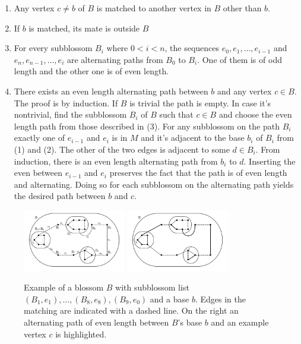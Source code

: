 \begin{enumerate}
    \item Any vertex $c \neq b$ of $B$ is matched to another vertex in $B$ other than $b$.
    \item If $b$ is matched, its mate is outside $B$
    \item For every subblossom $B_i$ where $0 < i < n$, the sequences $e_0, e_1, \dots, e_{i-1}$ and $e_n, e_{n-1}, \dots, e_i$ are alternating paths from $B_0$ to $B_i$. One of them is of odd length and the other one is of even length.
    \item There exists an even length alternating path between $b$ and any vertex $c \in B$. The proof is by induction. If $B$ is trivial the path is empty. In case it's nontrivial, find the subblossom $B_i$ of $B$ such that $c \in B$ and choose the even length path from those described in (3). For any subblossom on the path $B_i$ exactly one of $e_{i-1}$ and $e_{i}$ is in $M$ and it's adjacent to the base $b_i$ of $B_i$ from (1) and (2). The other of the two edges is adjacent to some $d \in B_i$. From induction, there is an even length alternating path from $b_i$ to $d$. Inserting the even between $e_{i-1}$ and $e_i$ preserves the fact that the path is of even length and alternating. Doing so for each subblossom on the alternating path yields the desired path between $b$ and $c$.
\end{enumerate}

\begin{figure}[b]
    \centering
    \includegraphics*[width=0.4\textwidth]{figures/Basic Blossom.png}
    \includegraphics*[width=0.4\textwidth]{figures/Blossom alternating clean.png}
    \caption{Example of a blossom $B$ with subblossom list $(B_1, e_1), \dots, (B_8, e_8), (B_9, e_0)$ and a base $b$. Edges in the matching are indicated with a dashed line. On the right an alternating path of even length between $B$'s base $b$ and an example vertex $c$ is highlighted.}
\end{figure}

